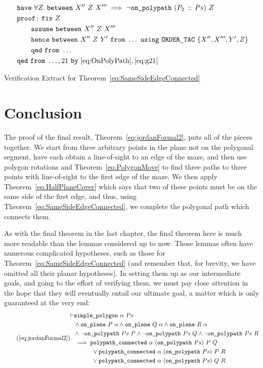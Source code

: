 \begin{boxedfigure}
\begin{align*}
  &\code{have}\ \forall Z.\; \between{X''}{Z}{X'''} \implies \neg\code{on\_polypath}\ (\cons{P_2}{Ps})\ Z\\\
  &\code{proof:}\ \code{fix}\ Z\\
  &\qquad \code{assume}\ \between{X''}{Z}{X'''}\\
  &\qquad \code{hence}\ \between{X''}{Z}{Y'}\ \code{from}\ \ldots\ \code{using}\ \code{ORDER\_TAC}\ \{X'',X''',Y',Z\}\\
  &\qquad \code{qed}\ \code{from}\ \ldots\\
  &\code{qed}\ \code{from}\ \ldots,21\ \code{by}\ \eqref{eq:OnPolyPath},\eqref{eq:g21}
\end{align*}
\caption{Verification Extract for Theorem~\ref{eq:SameSideEdgeConnected}}
\label{fig:SameSideEdgeConnectedExtract}
\end{boxedfigure}

\section{Conclusion}
The proof of the final result, Theorem~\ref{eq:jordanFormal2}, puts all of the pieces together. We start from three arbitrary points in the plane not on the polygonal segment, have each obtain a line-of-sight to an edge of the maze, and then use polygon rotations and Theorem~\ref{eq:PolygonMove} to find three paths to three points with line-of-sight to the first edge of the maze. We then apply  Theorem~\ref{eq:HalfPlaneCover} which says that two of these points must be on the same side of the first edge, and thus, using Theorem~\ref{eq:SameSideEdgeConnected}, we complete the polygonal path which connects them.

As with the final theorem in the last chapter, the final theorem here is much more readable than the lemmas considered up to now. Those lemmas often have numerous complicated hypotheses, such as those for Theorem~\ref{eq:SameSideEdgeConnected} (and remember that, for brevity, we have omitted all their planar hypotheses). In setting them up as our intermediate goals, and going to the effort of verifying them, we must pay close attention in the hope that they will eventually entail our ultimate goal, a matter which is only guaranteed at the very end:
\begin{equation}\tag{\ref{eq:jordanFormal2}}
\begin{aligned}
\vdash &\code{simple\_polygon}\ \alpha\ Ps\\
       &\wedge \code{on\_plane}\ P\ \alpha \wedge \code{on\_plane}\ Q\ \alpha \wedge \code{on\_plane}\ R\ \alpha\\
       &\wedge \neg\code{on\_polypath}\ Ps\ P\wedge \neg\code{on\_polypath}\ Ps\ Q\wedge \neg\code{on\_polypath}\ Ps\ R\\
       &\implies \code{polypath\_connected}\ \alpha\ (\code{on\_polypath}\ Ps)\ P\ Q\\
       &\qquad\quad\vee \code{polypath\_connected}\ \alpha\ (\code{on\_polypath}\ Ps)\ P\ R\\
       &\qquad\quad\vee \code{polypath\_connected}\ \alpha\ (\code{on\_polypath}\ Ps)\ Q\ R
\end{aligned}
\end{equation}

